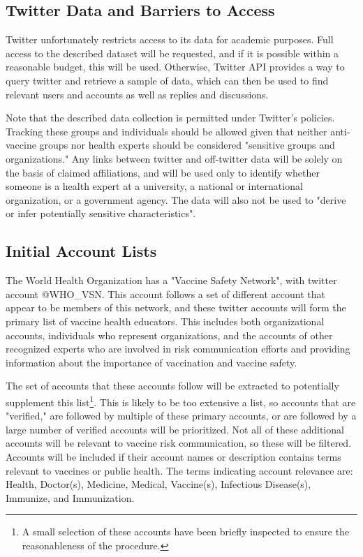 \documentclass{article}
\begin{document}
\subsection{Twitter Data and Barriers to Access}
Twitter unfortunately restricts access to its data for academic purposes. \cite{Alaimo2018} Full access to the described dataset will be requested, and if it is possible within a reasonable budget, this will be used. Otherwise, Twitter API provides a way to query twitter and retrieve a sample of data, which can then be used to find relevant users and accounts as well as replies and discussions. 

Note that the described data collection is permitted under Twitter's policies. Tracking these groups and individuals should be allowed given that neither anti-vaccine groups nor health experts should be considered "sensitive groups and organizations." Any links between twitter and off-twitter data will be solely on the basis of claimed affiliations, and will be used only to identify whether someone is a health expert at a university, a national or international organization, or a government agency. The data will also not be used to "derive or infer potentially sensitive characteristics".

\subsection{Initial Account Lists}

The World Health Organization has a "Vaccine Safety Network", with twitter account @WHO\_VSN. This account follows a set of different account that appear to be members of this network, and these twitter accounts will form the primary list of vaccine health educators.  This includes both organizational accounts, individuals who represent organizations, and the accounts of other recognized experts who are involved in risk communication efforts and providing information about the importance of vaccination and vaccine safety.

The set of accounts that these accounts follow will be extracted to potentially supplement this list\footnote{A small selection of these accounts have been briefly inspected to ensure the reasonableness of the procedure.}. This is likely to be too extensive a list, so accounts that are "verified," are followed by multiple of these primary accounts, or are followed by a large number of verified accounts will be prioritized. Not all of these additional accounts will be relevant to vaccine risk communication, so these will be filtered. Accounts will be included if their account names or description contains terms relevant to vaccines or public health. The terms indicating account relevance are: Health, Doctor(s), Medicine, Medical, Vaccine(s), Infectious Disease(s), Immunize, and Immunization.
\end{document}
